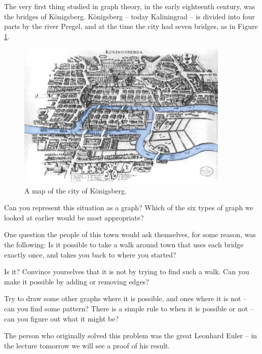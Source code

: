 \documentclass[nobib]{tufte-handout}
\begin{document}
The very first thing studied in graph theory, in the early eighteenth century, was the bridges of Königsberg. Königsberg -- today Kaliningrad -- is divided into four parts by the river Pregel, and at the time the city had seven bridges, as in Figure \ref{fig:konigsberg_map}.

\begin{figure}
  \centering
  \includegraphics[width=0.9\textwidth]{graphics/L1_exc/konigsberg_map.png}
  \caption{A map of the city of Königsberg.}
  \label{fig:konigsberg_map}
\end{figure}

\begin{xca}
  Can you represent this situation as a graph? Which of the six types of graph we looked at earlier would be most appropriate?
\end{xca}

One question the people of this town would ask themselves, for some reason, was the following: Is it possible to take a walk around town that uses each bridge exactly once, and takes you back to where you started?

\begin{xca}
  Is it? Convince yourselves that it is not by trying to find such a walk. Can you make it possible by adding or removing edges?

  Try to draw some other graphs where it is possible, and ones where it is not -- can you find some pattern? There is a simple rule to when it is possible or not -- can you figure out what it might be?
\end{xca}

The person who originally solved this problem was the great Leonhard Euler -- in the lecture tomorrow we will see a proof of his result.
\end{document}

